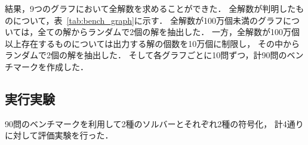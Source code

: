 

結果，9つのグラフにおいて全解数を求めることができた．
全解数が判明したものについて，表~\ref{tab:bench_graph}に示す．
全解数が100万個未満のグラフについては，全ての解からランダムで2個の解を抽出した．
一方，全解数が100万個以上存在するものについては出力する解の個数を10万個に制限し，
その中からランダムで2個の解を抽出した．
そして各グラフごとに10問ずつ，計90問のベンチマークを作成した．

\subsection{実行実験}
90問のベンチマークを利用して2種のソルバーとそれぞれ2種の符号化，
計4通りに対して評価実験を行った．

\begin{comment}
  \section{ASP ファクト形式}
  問題の入力として与えられるグラフ，色数，初期状態，目標状態のうち，
  グラフ，初期状態，目標状態はASP ファクトとして与えられる．
  図~\ref{fig:ex_graph}のグラフをファクト形式で表したものをコード~\ref{code:graph.lp}に示す．
  
  
  
  1～2行目ではそれぞれ頂点の数と辺の数を宣言している．
  4行目ではアトム\code{node}によって頂点1から頂点4を定義している．
  6行目ではアトム\code{edge}によって辺を定義している．
  \code{edge(X,Y)}は頂点\code{X}と頂点\code{Y}間に辺が存在することを意味する．
  
  次に， 図~\ref{fig:recol_s}，~\ref{fig:recol_g}の初期状態と目標状態をファクト形式で表したものを
  コード~\ref{code:path.lp}に示す．
  
  
  
  1行目ではアトム\code{start}によって初期状態を定義している．
  \code{start(X,C)}は初期状態において頂点\code{X}が色\code{C}で塗られることを意味する．
  2行目ではアトム\code{goal}によって目標状態を定義している．
  \code{goal(X,C)}は目標状態において頂点\code{X}が色\code{C}で塗られることを意味する．
  \end{comment}


